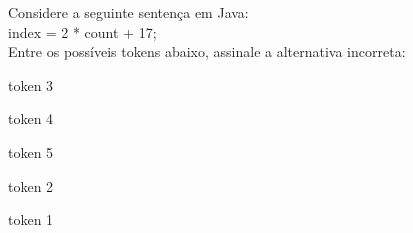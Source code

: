 \question[10]

Considere a seguinte sentença em Java:\\
index = 2 * count + 17;\\
Entre os possíveis tokens abaixo, assinale a alternativa incorreta:\\
\begin{choices}
\item token 3 
\item token 4
\item token 5 %
\item token 2
\item token 1 
\end{choices}
\answerline

